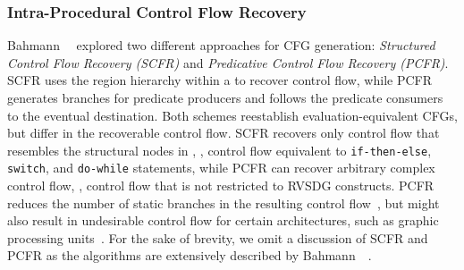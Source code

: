 \subsubsection{Intra-Procedural Control Flow Recovery}
Bahmann~\etal~\cite{Bahmann15} explored two different approaches for CFG generation:
\textit{Structured Control Flow Recovery (SCFR)} and \textit{Predicative Control Flow Recovery
(PCFR)}. SCFR uses the region hierarchy within a \lambdaregion to recover control flow, while PCFR
generates branches for predicate producers and follows the predicate consumers to the eventual
destination. Both schemes reestablish evaluation-equivalent CFGs, but differ in the recoverable
control flow. SCFR recovers only control flow that resembles the structural nodes in
\lambdaregions, \ie, control flow equivalent to \verb;if-then-else;, \verb;switch;, and
\verb;do-while; statements, while PCFR can recover arbitrary complex control flow, \ie, control
flow that is not restricted to RVSDG constructs. PCFR reduces the number of static branches in the
resulting control flow~\cite{Bahmann15}, but might also result in undesirable
control flow for certain architectures, such as graphic processing units~\cite{Reissmann16}.
For the sake of brevity, we omit a discussion of SCFR and PCFR as the algorithms are extensively
described by Bahmann~\etal~\cite{Bahmann15}.



